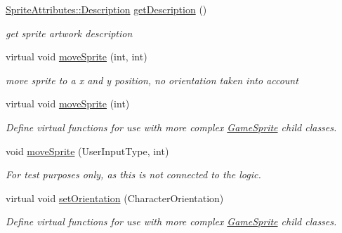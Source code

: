 \begin{DoxyCompactItemize}
\mbox{\label{class_game_sprite_a2ca8b811d79fbceae18e02c934e3e85b}} 
\mbox{\hyperlink{namespace_sprite_attributes_a3ece96d6288b14d53d84e2138392395c}{Sprite\+Attributes\+::\+Description}} \mbox{\hyperlink{class_game_sprite_a2ca8b811d79fbceae18e02c934e3e85b}{get\+Description}} ()
\begin{DoxyCompactList}\small\item\em get sprite artwork description \end{DoxyCompactList}\item 
\mbox{\label{class_game_sprite_a1cb6989acf2cc9666be1bc940b31d7c7}} 
virtual void \mbox{\hyperlink{class_game_sprite_a1cb6989acf2cc9666be1bc940b31d7c7}{move\+Sprite}} (int, int)
\begin{DoxyCompactList}\small\item\em move sprite to a x and y position, no orientation taken into account \end{DoxyCompactList}\item 
\mbox{\label{class_game_sprite_a35eac21d4f5d7e23d1bdd22b1e6a8517}} 
virtual void \mbox{\hyperlink{class_game_sprite_a35eac21d4f5d7e23d1bdd22b1e6a8517}{move\+Sprite}} (int)
\begin{DoxyCompactList}\small\item\em Define virtual functions for use with more complex \mbox{\hyperlink{class_game_sprite}{Game\+Sprite}} child classes. \end{DoxyCompactList}\item 
\mbox{\label{class_game_sprite_acf5168b8fa90814756fa660aabf6da70}} 
void \mbox{\hyperlink{class_game_sprite_acf5168b8fa90814756fa660aabf6da70}{move\+Sprite}} (User\+Input\+Type, int)
\begin{DoxyCompactList}\small\item\em For test purposes only, as this is not connected to the logic. \end{DoxyCompactList}\item 
\mbox{\label{class_game_sprite_acb65331428a0ae05f1ef6f521d51e4e7}} 
virtual void \mbox{\hyperlink{class_game_sprite_acb65331428a0ae05f1ef6f521d51e4e7}{set\+Orientation}} (Character\+Orientation)
\begin{DoxyCompactList}\small\item\em Define virtual functions for use with more complex \mbox{\hyperlink{class_game_sprite}{Game\+Sprite}} child classes. \end{DoxyCompactList}\item 

\end{DoxyCompactItemize}
